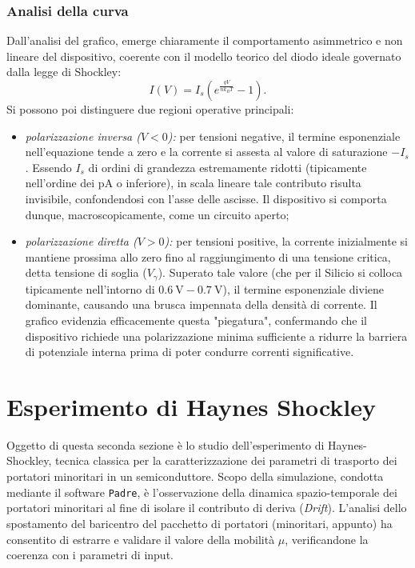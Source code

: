\documentclass[a4paper,11pt]{report}
\begin{document}
\subsection{Analisi della curva}
Dall'analisi del grafico, emerge chiaramente il comportamento asimmetrico e non lineare del dispositivo, coerente con il modello teorico del diodo ideale governato dalla legge di Shockley:
\begin{equation}
    I(V) = I_s \left( e^{\frac{qV}{n k_B T}} - 1 \right).
\end{equation}
Si possono poi distinguere due regioni operative principali:
\begin{itemize}
    \item \textit{polarizzazione inversa ($V < 0$):}
    per tensioni negative, il termine esponenziale nell'equazione tende a zero e la corrente si assesta al valore di saturazione $-I_s$. Essendo $I_s$ di ordini di grandezza estremamente ridotti (tipicamente nell'ordine dei $\si{\pico\ampere}$ o inferiore), in scala lineare tale contributo risulta invisibile, confondendosi con l'asse delle ascisse. Il dispositivo si comporta dunque, macroscopicamente, come un circuito aperto;

    \item \textit{polarizzazione diretta ($V > 0$):}
    per tensioni positive, la corrente inizialmente si mantiene prossima allo zero fino al raggiungimento di una tensione critica, detta tensione di soglia ($V_{\gamma}$).
    Superato tale valore (che per il Silicio si colloca tipicamente nell'intorno di $\SI{0.6}{\volt} - \SI{0.7}{\volt}$), il termine esponenziale diviene dominante, causando una brusca impennata della densità di corrente. Il grafico evidenzia efficacemente questa "piegatura", confermando che il dispositivo richiede una polarizzazione minima sufficiente a ridurre la barriera di potenziale interna prima di poter condurre correnti significative.
\end{itemize}


\chapter{Esperimento di Haynes Shockley}
\label{chap:HS}
Oggetto di questa seconda sezione è lo studio dell'esperimento di Haynes-Shockley, tecnica classica per la caratterizzazione dei parametri di trasporto dei portatori minoritari in un semiconduttore. Scopo della simulazione, condotta mediante il software \texttt{Padre}, è l'osservazione della dinamica spazio-temporale dei portatori minoritari al fine di isolare il contributo di deriva (\textit{Drift}). L'analisi dello spostamento del baricentro del pacchetto di portatori (minoritari, appunto) ha consentito di estrarre e validare il valore della mobilità $\mu$, verificandone la coerenza con i parametri di input. 
\end{document}
